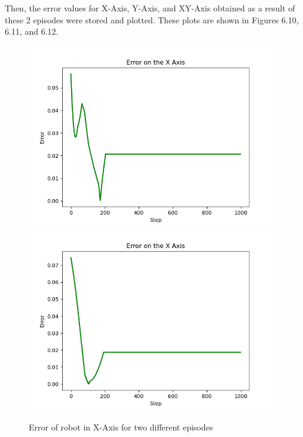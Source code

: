 \documentclass[12pt,twoside,a4]{mwbk}
\begin{document}
\noindent Then, the error values for X-Axis, Y-Axis, and XY-Axis obtained as a result of these 2 episodes were stored and plotted. These plots are shown in Figures 6.10, 6.11, and 6.12.
\newpage
\begin{figure}[h!]
    \centering
    \includegraphics[width=11cm, height=8cm]{error_test_x.png}
    \includegraphics[width=11cm, height=8cm]{error_test_x_2.png}
    \caption{Error of robot in X-Axis for two different episodes}
\end{figure}
\newpage
\end{document}
